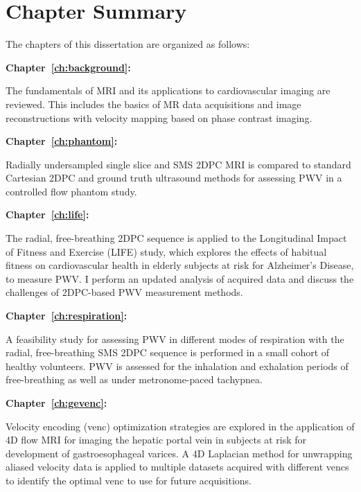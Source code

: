 \section{Chapter Summary}
The chapters of this dissertation are organized as follows:
\begin{description}
    \item \textbf{Chapter~\ref{ch:background}: } 
    
    The fundamentals of MRI and its applications to cardiovascular imaging are reviewed. This includes the basics of MR data acquisitions and image reconstructions with velocity mapping based on phase contrast imaging.

    \item \textbf{Chapter~\ref{ch:phantom}: }
    
    Radially undersampled single slice and SMS 2DPC MRI is compared to standard Cartesian 2DPC and ground truth ultrasound methods for assessing PWV in a controlled flow phantom study. 

    \item \textbf{Chapter~\ref{ch:life}: }
    
    The radial, free-breathing 2DPC sequence is applied to the Longitudinal Impact of Fitness and Exercise (LIFE) study, which explores the effects of habitual fitness on cardiovascular health in elderly subjects at risk for Alzheimer's Disease, to measure PWV\@. I perform an updated analysis of acquired data and discuss the challenges of 2DPC-based PWV measurement methods.

    \item \textbf{Chapter~\ref{ch:respiration}: } 
    
    A feasibility study for assessing PWV in different modes of respiration with the radial, free-breathing SMS 2DPC sequence is performed in a small cohort of healthy volunteers. PWV is assessed for the inhalation and exhalation periods of free-breathing as well as under metronome-paced tachypnea.

    \item \textbf{Chapter~\ref{ch:gevenc}: }
    
    Velocity encoding (venc) optimization strategies are explored in the application of 4D flow MRI for imaging the hepatic portal vein in subjects at risk for development of gastroesophageal varices. A 4D Laplacian method for unwrapping aliased velocity data is applied to multiple datasets acquired with different vencs to identify the optimal venc to use for future acquisitions.


\end{description}
